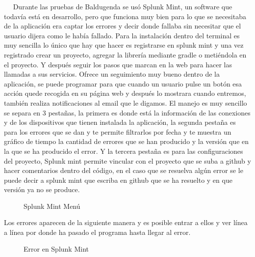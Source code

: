  
Durante las pruebas de Baldugenda se usó Splunk Mint, un software que todavía está en desarrollo, pero que funciona muy bien para lo que se necesitaba de la aplicación era captar los errores y decir donde fallaba sin necesitar que el usuario dijera como le había fallado.
Para la instalación dentro del terminal es muy sencilla lo único que hay que hacer es registrarse en splunk mint y una vez registrado crear un proyecto, agregar la librería mediante gradle o metiéndola en el proyecto.
Y después seguir los pasos que marcan en la web para hacer las llamadas a sus servicios.
Ofrece un seguimiento muy bueno dentro de la aplicación, se puede programar para que cuando un usuario pulse un botón esa acción quede recogida en su página web y después lo mostrara cuando entremos, también realiza notificaciones al email que le digamos. 
El manejo es muy sencillo se separa en 3 pestañas, la primera es donde está la información de las conexiones y de los dispositivos que tienen instalada la aplicación, la segunda pestaña es para los errores que se dan y te permite filtrarlos por fecha y te muestra un gráfico de tiempo la cantidad de errores que se han producido y la versión que en la que se ha producido el error. Y la tercera pestaña es para las configuraciones del proyecto, Splunk mint permite vincular con el proyecto que se suba a github y hacer comentarios dentro del código, en el caso que se resuelva algún error se le puede decir a splunk mint que escriba en github que se ha resuelto y en que versión ya no se produce.

\begin{figure}[H] 
  \begin{center} 
    \caption{Splunk Mint Menú} 
    \label{fig:SplunkMintMenu} 
  \end{center} 
\end{figure}

Los errores aparecen de la siguiente manera y es posible entrar a ellos y ver línea a línea por donde ha pasado el programa hasta llegar al error.

\begin{figure}[H] 
  \begin{center} 
    \caption{Error en Splunk Mint} 
    \label{fig:ErrorSplunkMint} 
  \end{center} 
\end{figure}


